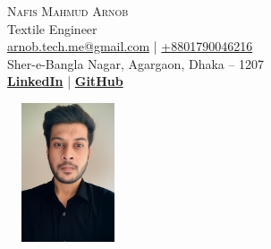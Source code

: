
\begin{minipage}{0.70\textwidth}
	{\Huge\scshape Nafis Mahmud Arnob}\\[0.7em]
	{\Large Textile Engineer}\\[0.5em]
	\href{mailto:arnob.tech.me@gmail.com}{arnob.tech.me@gmail.com}  |
	\href{tel:+8801790046216}{+8801790046216}
	\\ Sher-e-Bangla Nagar, Agargaon, Dhaka – 1207\\[0.7em]
	\textbf{\href{https://www.linkedin.com/in/arnob-mahmud/}{LinkedIn}}  |
	\textbf{\href{https://github.com/ArnobMahmud}{GitHub}}
\end{minipage}
\hfill
\begin{minipage}{0.20\textwidth}
	\includegraphics[width=3.6cm,height=4.1cm]{Assets/Arnob.png}
\end{minipage}
\\[0.5em]